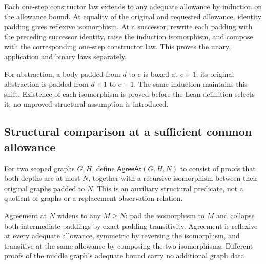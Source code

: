 Each one-step constructor law extends to any adequate allowance by induction
on the allowance bound. At equality of the original and requested allowance,
identity padding gives reflexive isomorphism. At a successor, rewrite each
padding with the preceding successor identity, raise the induction
isomorphism, and compose with the corresponding one-step constructor law.
This proves the unary, application and binary laws separately.

For abstraction, a body padded from $d$ to $e$ is boxed at $e+1$; its original
abstraction is padded from $d+1$ to $e+1$. The same induction maintains this
shift. Existence of each isomorphism is proved before the Lean definition
selects it; no unproved structural assumption is introduced.






\subsection{Structural comparison at a sufficient common allowance}

For two scoped graphs $G,H$, define $\mathsf{AgreeAt}(G,H,N)$ to consist of
proofs that both depths are at most $N$, together with a recursive isomorphism
between their original graphs padded to $N$. This is an auxiliary structural
predicate, not a quotient of graphs or a replacement observation relation.

Agreement at $N$ widens to any $M\geq N$: pad the isomorphism to $M$ and
collapse both intermediate paddings by exact padding transitivity. Agreement
is reflexive at every adequate allowance, symmetric by reversing the
isomorphism, and transitive at the same allowance by composing the two
isomorphisms. Different proofs of the middle graph's adequate bound carry
no additional graph data.





